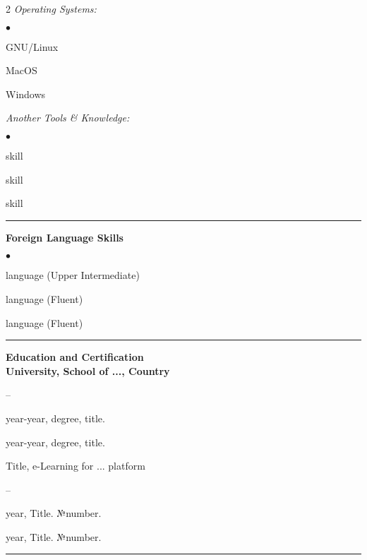 \documentclass[oneside,final,10pt]{extreport}
\newenvironment{compactlist}{
	\begin{list}{{$\bullet$}}{
		\setlength\leftmargin{0.4cm}
		\setlength\partopsep{0pt}
		\setlength\parskip{0pt}
		\setlength\parsep{0pt}
		\setlength\topsep{0pt}
		\setlength\itemsep{0pt}
	}
}{
	\end{list}
}
\newenvironment{innerlist}{
	\begin{list}{--}{
		\setlength\leftmargin{0.8cm}
		\setlength\partopsep{0pt}
		\setlength\parskip{0pt}
		\setlength\parsep{0pt}
		\setlength\topsep{0pt}
		\setlength\itemsep{0pt}
	}
}{
	\end{list}
}
\begin{document}
	\begin{multicols}{2}
		\textsl{Operating Systems:}
			\begin{compactlist}
				\item GNU/Linux
				\item MacOS
				\item Windows
			\end{compactlist}
		\textsl{Another Tools \& Knowledge:}
			\begin{compactlist}
				\item skill
				\item skill
				\item skill
			\end{compactlist}
	\end{multicols}
\rule{\textwidth}{0.4pt}

\bfseries
Foreign Language Skills
\mdseries
	\begin{compactlist}
		\item language (Upper Intermediate)
		\item language (Fluent)
		\item language (Fluent) 
	\end{compactlist}
\rule{\textwidth}{0.4pt}

\bfseries
Education and Certification
\mdseries \\[3pt]	
University, School of ..., Country  	
	\begin{innerlist}	
		\item year-year, degree, title. 
		\item year-year, degree, title. 
	\end{innerlist}	
Title, e-Learning for ... platform 
	\begin{innerlist}	
		\item year, Title. №number.
		\item year, Title. №number.
	\end{innerlist}	 
\rule{\textwidth}{0.4pt}
\end{document}
